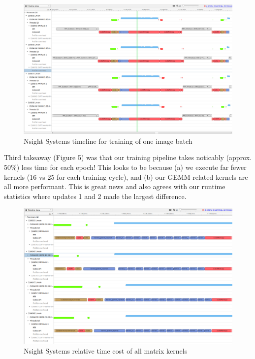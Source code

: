 \documentclass[12pt,letterpaper,twoside]{article}
\begin{document}
\begin{figure}[!htbp]
    \centering
    \includegraphics[scale=0.3]{nsight_systems_batch2.png}
    \caption{Nsight Systems timeline for training of one image batch}
\end{figure}

Third takeaway (Figure 5) was that our training pipeline takes noticably (approx. 50\%)
less time for each epoch! This looks to be because (a) we execute far fewer kernels (16
vs 25 for each training cycle), and (b) our GEMM related kernels are all more performant.
This is great news and also agrees with our runtime statistics where updates 1 and 2 made
the largest difference.

\begin{figure}[!htbp]
    \centering
    \includegraphics[scale=0.3]{nsight_systems_kernels2.png}
    \caption{Nsight Systems relative time cost of all matrix kernels}
\end{figure}
\end{document}
